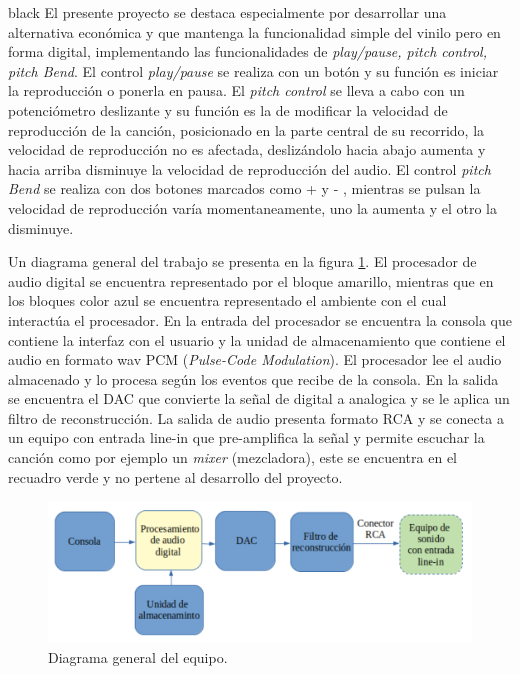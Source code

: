 \documentclass[11pt]{charter}
\begin{document}
\begin{consigna}{black}
El presente proyecto se destaca especialmente por desarrollar una alternativa económica y que mantenga la funcionalidad simple del vinilo pero en forma digital, implementando las funcionalidades de \textit{play/pause, pitch control, pitch Bend}. El control \textit{play/pause} se realiza con un botón y su función es iniciar la reproducción o ponerla en pausa. El \textit{pitch control} se lleva a cabo con un potenciómetro deslizante y su función es la de modificar la velocidad de reproducción de la canción, posicionado en la parte central de su recorrido, la velocidad de reproducción no es afectada, deslizándolo hacia abajo aumenta y hacia arriba disminuye la velocidad de reproducción del audio. El control \textit{ pitch Bend} se realiza con dos botones marcados como +  y - , mientras se pulsan la velocidad de reproducción varía momentaneamente, uno la aumenta y el otro la disminuye.

Un diagrama general del trabajo se presenta en la figura \ref{fig:diagBloques}. El procesador de audio digital se encuentra representado por el bloque amarillo, mientras que en los bloques color azul se encuentra representado el ambiente con el cual interactúa el procesador. En la entrada del procesador se encuentra la consola que contiene la interfaz con el usuario y la unidad de almacenamiento que contiene el audio en formato wav PCM (\textit{Pulse-Code Modulation}). El procesador lee el audio almacenado y lo procesa según los eventos que recibe de la consola. En la salida se encuentra el DAC que convierte la señal de digital a analogica y se le aplica un filtro de reconstrucción. La salida de audio presenta formato RCA y se conecta a un equipo con entrada line-in que pre-amplifica la señal y permite escuchar la canción como por ejemplo un \textit{mixer} (mezcladora), este se encuentra en el recuadro verde y no pertene al desarrollo del proyecto. 

\begin{figure}[htpb]
\centering 
\includegraphics[width=.9\textwidth]{./Figuras/diagBloquesDSP.png}
\caption{Diagrama general del equipo.}
\label{fig:diagBloques}
\end{figure}


\end{consigna}
\end{document}
